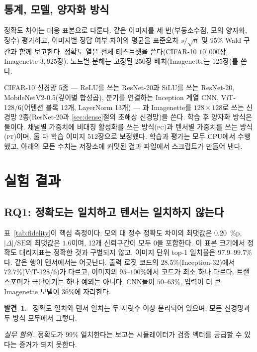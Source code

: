 \documentclass[journal]{IEEEtran}
\newcommand{\finding}[1]{\smallskip\noindent\textbf{발견~#1.}~}
\newcommand{\implication}{\emph{실무 함의.}~}
\begin{document}
\subsection{통계, 모델, 양자화 방식}
정확도 차이는 대응 표본으로 다룬다. 같은 이미지를 세 번(부동소수점, 모의 양자화, 정수) 평가하고, 이미지별 정답
여부 차이의 평균을 표준오차 $s/\sqrt{n}$ 및 $95\%$ Wald 구간과 함께 보고한다. 정확도 열은 전체 테스트셋을
쓴다(CIFAR-10 $10{,}000$장, Imagenette $3{,}925$장). 노드별 분해는 고정된 $250$장 배치(Imagenette는 $125$장)를
쓴다.

CIFAR-10 신경망 5종 --- ReLU를 쓰는 ResNet-20과 SiLU를 쓰는 ResNet-20, MobileNetV2-0.5(깊이별 합성곱), 분기를
연결하는 Inception 계열 CNN, ViT-128/6(어텐션 블록 12개, LayerNorm 13개) --- 과 Imagenette를 $128\times128$로 쓰는 신경망
2종(ResNet-20과 \ref{sec:dense}절의 초해상 신경망)을 쓴다. 학습 후 양자화 방식은 둘이다. 채널별 가중치에 비대칭 활성화를 쓰는
방식(\textsc{pc})과 텐서별 가중치를 쓰는 방식(\textsc{pt})이며, 둘 다 학습 이미지 $512$장으로 보정했다. 학습과
평가는 모두 CPU에서 수행했고, 아래의 모든 수치는 저장소에 커밋된 결과 파일에서 스크립트가 만들어 낸다.

\section{실험 결과}

\subsection{RQ1: 정확도는 일치하고 텐서는 일치하지 않는다}
표~\ref{tab:fidelity}이 핵심 측정이다. 모의 대 정수 정확도 차이의 최댓값은 $0.20$~\%p, $|\Delta|/\mathrm{SE}$의
최댓값은 $1.6$이며, 12개 신뢰구간이 모두 0을 포함한다. 이 표본 크기에서 정확도 대리지표는 정확한 것과 구별되지
않고, 이미지 단위 top-1 일치율은 $97.9$--$99.7\%$다. 같은 행이 텐서에서는 어긋난다. 출력 로짓 코드의
$28.5\%$(Inception-32)에서 $72.7\%$(ViT-128/6)가 다르고, 이미지의 $95$--$100\%$에서 코드가 최소 하나 다르다.
트랜스포머가 극단이기는 하나 예외는 아니다. CNN들이 $50$--$63\%$, 입력이 더 큰 Imagenette 모델이 $36\%$에
자리한다.

\finding{1} 정확도 일치와 텐서 일치는 두 자릿수 이상 분리되어 있으며, 모든 신경망과 두 방식 모두에서 그렇다.

\implication 정확도가 $99\%$ 일치한다는 보고는 시뮬레이터가 검증 벡터를 공급할 수 있다는 증거가 되지 못한다.

\begin{table}[!t]
\caption{출력 텐서가 결과물인 과제: Imagenette에서의 ESPCN $\times 2$, 이미지 $3{,}925$장, 이미지당 출력값
$49{,}152$개를 같은 폭 구성의 두 깊이에서 측정했다. PSNR은 $[0,1]$ 범위의 dB. 양자화 자체는 float32 대비
합성곱 3개에서 $0.28$--$0.67$~dB, 9개에서 $0.57$--$1.15$~dB를 잃으며 이는 옆 칸의 모의-정수 차이보다 세 자릿수
크다. 반면 코드가 다른 비율은 깊이에 따라 한 자릿수 움직인다.}
\label{tab:dense}
\centering
\footnotesize

\end{table}
\end{document}
